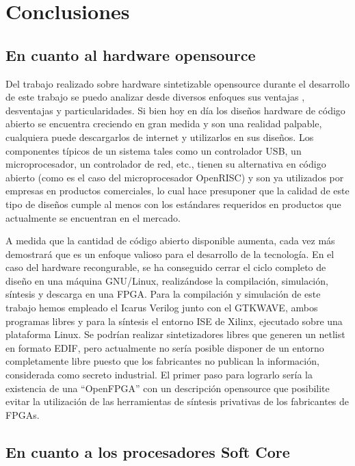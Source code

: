  \chapter{Conclusiones}
	 
	\section{En cuanto al hardware opensource} 

Del trabajo realizado sobre hardware sintetizable opensource durante el desarrollo de este trabajo se puedo analizar desde diversos enfoques sus
ventajas , desventajas y particularidades. Si bien hoy en día los diseños hardware de código abierto se encuentra creciendo en gran medida y son una
realidad palpable, cualquiera puede descargarlos de internet y utilizarlos en sus diseños. Los componentes típicos de un sistema tales como un
controlador USB, un microprocesador, un controlador de red, etc., tienen su alternativa en código abierto (como es el caso del microprocesador
OpenRISC) y son ya utilizados por empresas en productos comerciales, lo cual hace presuponer que la calidad de este tipo de diseños cumple al menos
con los estándares requeridos en productos que actualmente se encuentran en el mercado.

A medida que la cantidad de código abierto disponible aumenta, cada vez más demostrará que es un enfoque valioso para el desarrollo de la tecnología.
En el caso del hardware recongurable, se ha conseguido cerrar el ciclo completo de diseño en una máquina GNU/Linux, realizándose la compilación,
simulación, síntesis y descarga en una FPGA. Para la compilación y simulación de este trabajo hemos empleado el Icarus Verilog junto con el GTKWAVE,
ambos programas libres y para la síntesis el entorno ISE de Xilinx, ejecutado sobre una plataforma Linux. Se podrían realizar sintetizadores libres
que generen un netlist en formato EDIF, pero actualmente no sería posible disponer de un entorno completamente libre puesto que los fabricantes no
publican la información, considerada como secreto industrial. El primer paso para lograrlo sería la existencia de una ``OpenFPGA'' con un descripción
opensource que posibilite evitar la utilización de las herramientas de síntesis privativas de los fabricantes de FPGAs.

	\section{En cuanto a los procesadores Soft Core} 
	
